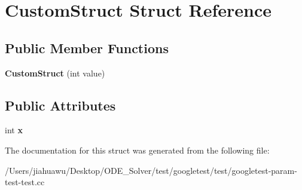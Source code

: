 \hypertarget{struct_custom_struct}{}\section{Custom\+Struct Struct Reference}
\label{struct_custom_struct}
\subsection*{Public Member Functions}
\begin{DoxyCompactItemize}
\item 
\mbox{\label{struct_custom_struct_aeab194957ba9e056e81c721e83c61941}} 
{\bfseries Custom\+Struct} (int value)
\end{DoxyCompactItemize}
\subsection*{Public Attributes}
\begin{DoxyCompactItemize}
\item 
\mbox{\label{struct_custom_struct_a436b0c2ffdab1f711fa40cfa3e246602}} 
int {\bfseries x}
\end{DoxyCompactItemize}


The documentation for this struct was generated from the following file\+:\begin{DoxyCompactItemize}
\item 
/\+Users/jiahuawu/\+Desktop/\+O\+D\+E\+\_\+\+Solver/test/googletest/test/googletest-\/param-\/test-\/test.\+cc\end{DoxyCompactItemize}
